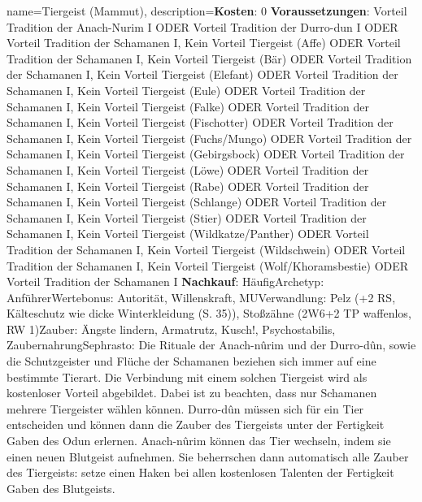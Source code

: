 {
    name={Tiergeist (Mammut)},
    description={\textbf{Kosten}: 0 \textbf{Voraussetzungen}: Vorteil Tradition der Anach-Nurim I ODER Vorteil Tradition der Durro-dun I ODER Vorteil Tradition der Schamanen I, Kein Vorteil Tiergeist (Affe) ODER Vorteil Tradition der Schamanen I, Kein Vorteil Tiergeist (Bär) ODER Vorteil Tradition der Schamanen I, Kein Vorteil Tiergeist (Elefant) ODER Vorteil Tradition der Schamanen I, Kein Vorteil Tiergeist (Eule) ODER Vorteil Tradition der Schamanen I, Kein Vorteil Tiergeist (Falke) ODER Vorteil Tradition der Schamanen I, Kein Vorteil Tiergeist (Fischotter) ODER Vorteil Tradition der Schamanen I, Kein Vorteil Tiergeist (Fuchs/Mungo) ODER Vorteil Tradition der Schamanen I, Kein Vorteil Tiergeist (Gebirgsbock) ODER Vorteil Tradition der Schamanen I, Kein Vorteil Tiergeist (Löwe) ODER Vorteil Tradition der Schamanen I, Kein Vorteil Tiergeist (Rabe) ODER Vorteil Tradition der Schamanen I, Kein Vorteil Tiergeist (Schlange) ODER Vorteil Tradition der Schamanen I, Kein Vorteil Tiergeist (Stier) ODER Vorteil Tradition der Schamanen I, Kein Vorteil Tiergeist (Wildkatze/Panther) ODER Vorteil Tradition der Schamanen I, Kein Vorteil Tiergeist (Wildschwein) ODER Vorteil Tradition der Schamanen I, Kein Vorteil Tiergeist (Wolf/Khoramsbestie) ODER Vorteil Tradition der Schamanen I \textbf{Nachkauf}: Häufig\newline Archetyp: Anführer\newline Wertebonus: Autorität, Willenskraft, MU\newline Verwandlung: Pelz (+2 RS, Kälteschutz wie dicke Winterkleidung (S. 35)), Stoßzähne (2W6+2 TP waffenlos, RW 1)\newline Zauber: Ängste lindern, Armatrutz, Kusch!, Psychostabilis, Zaubernahrung\newline Sephrasto: Die Rituale der Anach-nûrim und der Durro-dûn, sowie die Schutzgeister und Flüche der Schamanen beziehen sich immer auf eine bestimmte Tierart. Die Verbindung mit einem solchen Tiergeist wird als kostenloser Vorteil abgebildet. Dabei ist zu beachten, dass nur Schamanen mehrere Tiergeister wählen können. Durro-dûn müssen sich für ein Tier entscheiden und können dann die Zauber des Tiergeists unter der Fertigkeit Gaben des Odun erlernen. Anach-nûrim können das Tier wechseln, indem sie einen neuen Blutgeist aufnehmen. Sie beherrschen dann automatisch alle Zauber des Tiergeists: setze einen Haken bei allen kostenlosen Talenten der Fertigkeit Gaben des Blutgeists.}
}


